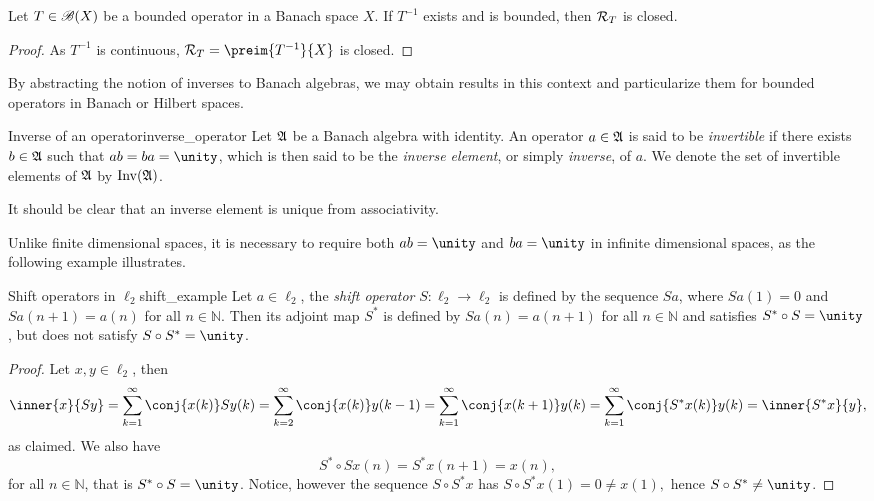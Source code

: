 \begin{corollary}
    Let \(T\in \mathscr{B}(X)\) be a bounded operator in a Banach space \(X\). If \(T^{-1}\) exists and is bounded, then \(\mathcal{R}_{T}\) is closed.
\end{corollary}
\begin{proof}
    As \(T^{-1}\) is continuous, \(\range{T} = \preim{T^{-1}}{X}\) is closed.
\end{proof}

By abstracting the notion of inverses to Banach algebras, we may obtain results in this context and particularize them for bounded operators in Banach or Hilbert spaces.
\begin{definition}{Inverse of an operator}{inverse_operator}
    Let \(\mathfrak{A}\) be a Banach algebra with identity. An operator \(a \in \mathfrak{A}\) is said to be \emph{invertible} if there exists \(b \in \mathfrak{A}\) such that \(ab = ba = \unity\), which is then said to be the \emph{inverse element}, or simply \emph{inverse}, of \(a\). We denote the set of invertible elements of \(\mathfrak{A}\) by \(\operatorname{Inv}(\mathfrak{A})\).
\end{definition}
\begin{remark}
    It should be clear that an inverse element is unique from associativity.
\end{remark}

Unlike finite dimensional spaces, it is necessary to require both \(ab = \unity\) and \(ba = \unity\) in infinite dimensional spaces, as the following example illustrates.
\begin{example}{Shift operators in \(\ell_2\)}{shift_example}
    Let \(a \in \ell_2\), the \emph{shift operator} \(S : \ell_2 \to \ell_2\) is defined by the sequence \(Sa\), where \(Sa(1) = 0\) and \(Sa(n+1) = a(n)\) for all \(n \in \mathbb{N}\). Then its adjoint map \(S^*\) is defined by \(Sa(n) = a(n+1)\) for all \(n \in \mathbb{N}\) and satisfies \(S^*\circ S = \unity\), but does not satisfy \(S \circ S^* = \unity\).
\end{example}
\begin{proof}
    Let \(x,y \in \ell_2\), then
    \begin{equation*}
        \inner{x}{Sy} = \sum_{k=1}^\infty \conj{x(k)} Sy(k) = \sum_{k=2}^\infty \conj{x(k)} y(k-1) = \sum_{k=1}^\infty \conj{x(k+1)}y(k) = \sum_{k=1}^\infty \conj{S^*x(k)}y(k) = \inner{S^*x}{y},
    \end{equation*}
    as claimed. We also have
    \begin{equation*}
        S^* \circ Sx(n) = S^*x(n+1) = x(n),
    \end{equation*}
    for all \(n \in \mathbb{N}\), that is \(S^* \circ S = \unity\). Notice, however the sequence \(S \circ S^* x\) has \(S\circ S^* x(1) = 0 \neq x(1),\) hence \(S \circ S^* \neq \unity\).
\end{proof}

